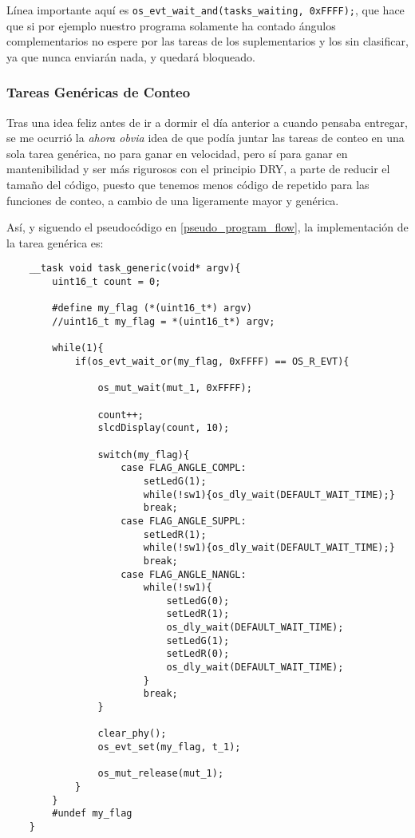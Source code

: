 \documentclass[a4paper,openright,12pt]{article}
\begin{document}
Línea importante aquí es \texttt{os\_evt\_wait\_and(tasks\_waiting, 0xFFFF);}, que hace que si por ejemplo nuestro programa solamente ha contado ángulos complementarios no espere por
las tareas de los suplementarios y los sin clasificar, ya que nunca enviarán nada, y quedará bloqueado.

\subsubsection{Tareas Genéricas de Conteo}\label{generic_counting_tasks}
Tras una idea feliz antes de ir a dormir el día anterior a cuando pensaba entregar, se me ocurrió la \emph{ahora obvia} idea de que podía juntar las tareas de conteo en una sola tarea
genérica, no para ganar en velocidad, pero sí para ganar en mantenibilidad y ser más rigurosos con el principio DRY, a parte de reducir el tamaño del código, puesto que tenemos menos código
de repetido para las funciones de conteo, a cambio de una ligeramente mayor y genérica.

\bigskip

Así, y siguendo el pseudocódigo en \ref{pseudo_program_flow}, la implementación de la tarea genérica es:
\begin{verbatim}
    __task void task_generic(void* argv){
        uint16_t count = 0;
        
        #define my_flag (*(uint16_t*) argv)
        //uint16_t my_flag = *(uint16_t*) argv;
        
        while(1){
            if(os_evt_wait_or(my_flag, 0xFFFF) == OS_R_EVT){
                
                os_mut_wait(mut_1, 0xFFFF);
                
                count++;
                slcdDisplay(count, 10);
                
                switch(my_flag){
                    case FLAG_ANGLE_COMPL:
                        setLedG(1);
                        while(!sw1){os_dly_wait(DEFAULT_WAIT_TIME);}
                        break;
                    case FLAG_ANGLE_SUPPL:
                        setLedR(1);
                        while(!sw1){os_dly_wait(DEFAULT_WAIT_TIME);}
                        break;
                    case FLAG_ANGLE_NANGL:
                        while(!sw1){
                            setLedG(0);
                            setLedR(1);
                            os_dly_wait(DEFAULT_WAIT_TIME);
                            setLedG(1);
                            setLedR(0);
                            os_dly_wait(DEFAULT_WAIT_TIME);
                        }
                        break;
                }

                clear_phy();
                os_evt_set(my_flag, t_1);
                
                os_mut_release(mut_1);
            }
        }
        #undef my_flag
    }
\end{verbatim}
\end{document}
